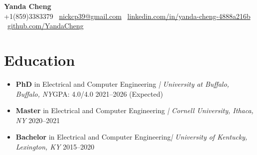 \documentclass[letterpaper,10pt]{article}
\begin{document}
\begin{center}
  {\Large \textbf{Yanda Cheng}} \\
  \vspace{2pt}
  \small +1(859)3383379 \textbar\ \href{mailto:nickcp39@gmail.com}{nickcp39@gmail.com} \textbar\
\href{https://linkedin.com/in/yanda-cheng-4888a216b}{linkedin.com/in/yanda-cheng-4888a216b} \textbar\
\href{https://github.com/YandaCheng}{github.com/YandaCheng}

\end{center}
\vspace*{-10pt}
\vspace*{-5pt}





\section{Education}
\begin{itemize}[leftmargin=0.0in, label={}, itemsep=2pt, topsep=2pt]
  \item \textbf{PhD}   in Electrical and Computer Engineering \hfill\textit{| University at Buffalo, Buffalo, NY}\hfill GPA: 4.0/4.0 \hfill 2021--2026 (Expected)
  \vspace*{-3pt}
  \item \textbf{Master}  in Electrical and Computer Engineering \hfill\textit{| Cornell University, Ithaca, NY} \hfill 2020--2021
  \vspace*{-3pt}
  \item \textbf{Bachelor}  in Electrical and Computer Engineering\hfill  \textit{| University of Kentucky, Lexington, KY} \hfill 2015--2020
\end{itemize}

\vspace*{-10pt}
\end{document}
